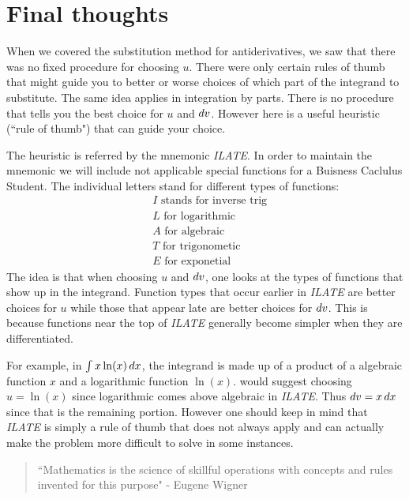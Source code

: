 \documentclass[noauthor]{ximera}
\begin{document}
\section{Final thoughts}
When we covered the substitution method for antiderivatives, we saw that there was no fixed procedure for choosing $u$. There were only certain rules of thumb that might guide you to better or worse choices of which part of the integrand to substitute. The same idea applies in integration by parts. There is no procedure that tells you the best choice for $u$ and $\mathop{}\!d v$. However here is a useful heuristic (``rule of thumb") that can guide your choice.

The heuristic is referred by the mnemonic \textit{ILATE}. In order to maintain the mnemonic we will include not applicable special functions for a Buisness Caclulus Student.  The individual letters stand for different types of functions:
\begin{align}
&I \text{  stands for inverse trig} \\
&L \text{  for logarithmic} \\
&A \text{  for algebraic} \\
&T \text{  for trigonometic} \\
&E \text{  for exponetial}
\end{align}
The idea is that when choosing $u$ and $\mathop{}\!d v$, one looks at the types of functions that show up in the integrand. Function types that occur earlier in \textit{ILATE} are better choices for $u$ while those that appear late are better choices for $\mathop{}\!d v$. This is because functions near the top of  \textit{ILATE} generally become simpler when they are differentiated.

For example, in $\int x \ln(x) \mathop{}\!d x$, the integrand is made up of a product of a algebraic function $x$ and a logarithmic function $\ln(x)$.    would suggest choosing $u=\ln(x)$ since logarithmic comes above algebraic in \textit{ILATE}. Thus $\mathop{}\!d v=x \mathop{}\!d x$ since that is the remaining portion. However one should keep in mind that \textit{ILATE} is simply a rule of thumb that does not always apply and can actually make the problem more difficult to solve in some instances.

\begin{quote}
``Mathematics is the science of skillful operations with concepts and rules invented for this purpose" - Eugene Wigner
\end{quote}
\end{document}
